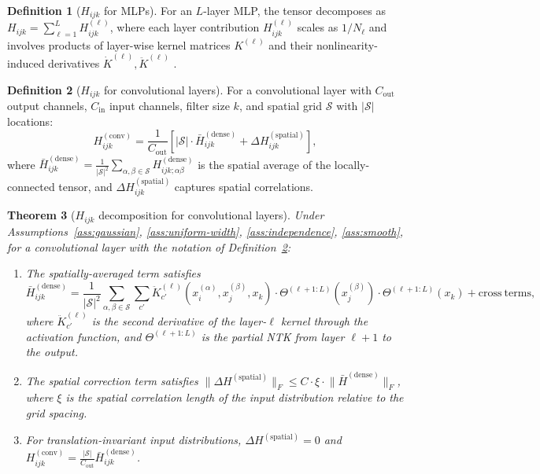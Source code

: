 \documentclass[11pt]{article}
\newtheorem{theorem}{Theorem}[section]
\theoremstyle{definition}
\newtheorem{definition}[theorem]{Definition}
\newcommand{\cS}{\mathcal{S}}
\newcommand{\norm}[1]{\lVert #1 \rVert}
\renewcommand{\Theta}{\varTheta}
\begin{document}
\begin{definition}[$H_{ijk}$ for MLPs]
\label{def:H-mlp}
For an $L$-layer MLP, the tensor decomposes as $H_{ijk} = \sum_{\ell=1}^L H_{ijk}^{(\ell)}$, where each layer contribution $H_{ijk}^{(\ell)}$ scales as $1/N_\ell$ and involves products of layer-wise kernel matrices $K^{(\ell)}$ and their nonlinearity-induced derivatives $\dot{K}^{(\ell)}, \ddot{K}^{(\ell)}$ \citep{dyer2020asymptotics}.
\end{definition}

\begin{definition}[$H_{ijk}$ for convolutional layers]
\label{def:H-conv}
For a convolutional layer with $C_{\mathrm{out}}$ output channels, $C_{\mathrm{in}}$ input channels, filter size $k$, and spatial grid $\cS$ with $|\cS|$ locations:
\begin{equation}
\label{eq:H-conv}
H_{ijk}^{(\mathrm{conv})} = \frac{1}{C_{\mathrm{out}}} \left[|\cS| \cdot \bar{H}_{ijk}^{(\mathrm{dense})} + \Delta H_{ijk}^{(\mathrm{spatial})}\right],
\end{equation}
where $\bar{H}_{ijk}^{(\mathrm{dense})} = \frac{1}{|\cS|^2}\sum_{\alpha,\beta \in \cS} H_{ijk;\alpha\beta}^{(\mathrm{dense})}$ is the spatial average of the locally-connected tensor, and $\Delta H_{ijk}^{(\mathrm{spatial})}$ captures spatial correlations.
\end{definition}

\begin{theorem}[$H_{ijk}$ decomposition for convolutional layers]
\label{thm:H-conv}
Under Assumptions~\ref{ass:gaussian}, \ref{ass:uniform-width}, \ref{ass:independence}, \ref{ass:smooth}, for a convolutional layer with the notation of Definition~\ref{def:H-conv}:
\begin{enumerate}[label=(\roman*)]
\item The spatially-averaged term satisfies
\begin{equation}
\bar{H}_{ijk}^{(\mathrm{dense})} = \frac{1}{|\cS|^2} \sum_{\alpha,\beta \in \cS} \sum_{c'} \ddot{K}_{c'}^{(\ell)}(x_i^{(\alpha)}, x_j^{(\beta)}, x_k) \cdot \Theta^{(\ell+1:L)}(x_j^{(\beta)}) \cdot \Theta^{(\ell+1:L)}(x_k) + \mathrm{cross\ terms},
\end{equation}
where $\ddot{K}_{c'}^{(\ell)}$ is the second derivative of the layer-$\ell$ kernel through the activation function, and $\Theta^{(\ell+1:L)}$ is the partial NTK from layer $\ell+1$ to the output.
\item The spatial correction term satisfies $\norm{\Delta H^{(\mathrm{spatial})}}_F \le C \cdot \xi \cdot \norm{\bar{H}^{(\mathrm{dense})}}_F$, where $\xi$ is the spatial correlation length of the input distribution relative to the grid spacing.
\item For translation-invariant input distributions, $\Delta H^{(\mathrm{spatial})} = 0$ and $H_{ijk}^{(\mathrm{conv})} = \frac{|\cS|}{C_{\mathrm{out}}} \bar{H}_{ijk}^{(\mathrm{dense})}$.
\end{enumerate}
\end{theorem}
\end{document}
